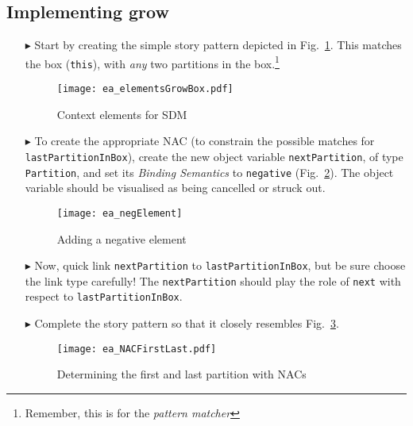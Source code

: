 \newpage
\hypertarget{growBox vis}{}
\subsection{Implementing grow}
\visHeader

\begin{itemize}
 
\item[$\blacktriangleright$] Start by creating the simple story pattern depicted in Fig.~\ref{fig:sdm_grow_1}. This matches the box
(\texttt{this}), with \emph{any} two partitions in the box.\footnote{Remember, this is for the \emph{pattern matcher}}

\begin{figure}[htbp]
\begin{center}
  \texttt{[image: ea\_elementsGrowBox.pdf]}
  \caption{Context elements for SDM}  
  \label{fig:sdm_grow_1}
\end{center}
\end{figure}

\item[$\blacktriangleright$] To create the appropriate \mbox{NAC} (to constrain the possible matches for \texttt{lastPartitionInBox}),  create the new object
variable \texttt{nextPartition}, of type \texttt{Partition}, and set  its \emph{Binding Semantics} to \texttt{negative}
(Fig.~\ref{fig:sdm_grow_2}). The object variable should be visualised as being cancelled or struck out. %
 
\begin{figure}[htbp]
\begin{center}
  \texttt{[image: ea\_negElement]}
  \caption{Adding a negative element}  
  \label{fig:sdm_grow_2}
\end{center}
\end{figure}
 
\item[$\blacktriangleright$] Now, quick link \texttt{nextPartition} to \texttt{lastPartitionInBox}, but be sure choose the link type carefully! The
\texttt{nextPartition} should play the role of \texttt{next} with respect to \texttt{lastPartitionInBox}.

\item[$\blacktriangleright$] Complete the story pattern so that it closely resembles Fig.~\ref{fig:sdm_grow_3}. 

\begin{figure}[htbp]
\begin{center}
  \texttt{[image: ea\_NACFirstLast.pdf]} 
  \caption{Determining the first and last partition with NACs}  
  \label{fig:sdm_grow_3}
\end{center}
\end{figure}
 

\end{itemize}
